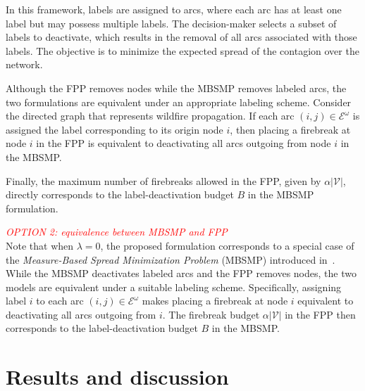 \documentclass[a4paper,fleqn]{cas-sc}
\begin{document}
In this framework, labels are assigned to arcs, where each arc has at least one label but may possess multiple labels. 
The decision-maker selects a subset of labels to deactivate, which results in the removal of all arcs associated with those labels. 
The objective is to minimize the expected spread of the contagion over the network.

Although the FPP removes nodes while the MBSMP removes labeled arcs, the two formulations are equivalent under an appropriate labeling scheme. 
Consider the directed graph that represents wildfire propagation. 
If each arc $(i,j) \in \mathcal{E}^{\omega}$ is assigned the label corresponding to its origin node $i$, then placing a firebreak at node $i$ in the FPP is equivalent to deactivating all arcs outgoing from node $i$ in the MBSMP.

Finally, the maximum number of firebreaks allowed in the FPP, given by $\alpha |\mathcal{V}|$, directly corresponds to the label-deactivation budget $B$ in the MBSMP formulation.

\textcolor{red}{\emph{OPTION 2:  equivalence between MBSMP and FPP}}\\
Note that when $\lambda = 0$, the proposed formulation corresponds to a special case of the 
\textit{Measure-Based Spread Minimization Problem} (MBSMP) introduced in~\citep{taninmics2024benders}. 
While the MBSMP deactivates labeled arcs and the FPP removes nodes, the two models are equivalent under a suitable labeling scheme. 
Specifically, assigning label $i$ to each arc $(i,j) \in \mathcal{E}^{\omega}$ makes placing a firebreak at node $i$ equivalent to deactivating all arcs outgoing from $i$. 
The firebreak budget $\alpha |\mathcal{V}|$ in the FPP then corresponds to the label-deactivation budget $B$ in the MBSMP.

\section{Results and discussion}
\label{S:4}
\end{document}
